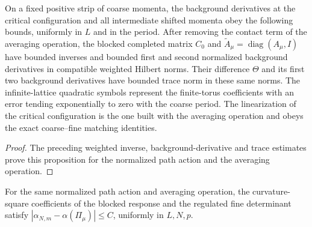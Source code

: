 \begin{proposition}\label{ch07:comparison-input}
On a fixed positive strip of coarse momenta, the background derivatives at the critical
configuration and all intermediate shifted momenta obey the following
bounds, uniformly in $L$ and in the period. After removing the
contact term of the averaging operation, the blocked completed matrix $C_0$ and
$\widetilde A_\mu=\operatorname{diag}(A_\mu,I)$ have bounded inverses
and bounded first and second normalized background derivatives in
compatible weighted Hilbert norms. Their difference $\Theta$ and its
first two background derivatives have bounded trace norm in these same norms.
The infinite-lattice quadratic symbols represent the finite-torus coefficients
with an error tending exponentially to zero with the coarse period.
The linearization of the critical configuration is the one built with the averaging operation and obeys the
exact coarse--fine matching identities.
\end{proposition}

\begin{proof}
The preceding weighted inverse, background-derivative and trace estimates prove this
proposition for the normalized path action and the averaging operation.
\end{proof}

\begin{proposition}\label{ch07:comparison-prop}
For the same normalized path action and averaging operation, the curvature-square
coefficients of the blocked response and the regulated fine determinant
satisfy $|\alpha_{N,m}-\alpha(\Pi_\mu)|\le C$, uniformly in $L,N,p$.
\end{proposition}

